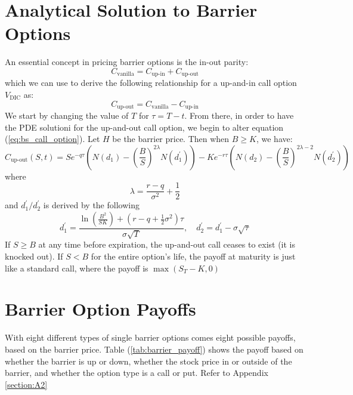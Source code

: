 \section{Analytical Solution to Barrier Options}

An essential concept in pricing barrier options is the in-out parity:
\[
	C_{\text{vanilla}}=C_{\text{up-in}}+C_{\text{up-out}}
\]
which we can use to derive the following relationship for a up-and-in call option$V_{\text{DIC}}$ as:
\[
	C_{\text{up-out}}=C_{\text{vanilla}}-C_{\text{up-in}}
\]
We start by changing the value of $T$ for $\tau=T-t$. From there, in order to have the PDE solutioni for the up-and-out call option, we begin to alter equation (\ref{eq:bs_call_option}). Let $H$ be the barrier price. Then when $B\geq K$, we have:
\begin{equation}\label{eq:DOC}
	C_{\text{up-out}}(S,t)=Se^{-q\tau}\left(N(d_1)-\left(\frac{B}{S}\right)^{2\lambda}N(d^\prime_1)\right)-Ke^{-r\tau}\left(N(d_2)-\left(\frac{B}{S}\right)^{2\lambda-2} N(d^\prime_2)\right)
\end{equation}
where
\begin{equation}
	\lambda=\frac{r-q}{\sigma^2}+\frac{1}{2}
\end{equation}
and $d^\prime_1/d^\prime_2$ is derived by the following
\begin{equation}
	d^\prime_1=\frac{\ln\left(\frac{B^2}{SK}\right)+(r-q+\tfrac{1}{2}\sigma^2)\tau}{\sigma\sqrt{T}},\quad d^\prime_2=d^\prime_1-\sigma\sqrt{\tau}
\end{equation}
If $S\geq B$ at any time before expiration, the up-and-out call ceases to exist (it is knocked out). If $S<B$ for the entire option's life, the payoff at maturity is just like a standard call, where the payoff is $\max\left(S_T-K, 0\right)$

\section{Barrier Option Payoffs}

With eight different types of single barrier options comes eight possible payoffs, based on the barrier price. Table (\ref{tab:barrier_payoff}) shows the payoff based on whether the barrier is up or down, whether the stock price in or outside of the barrier, and whether the option type is a call or put. Refer to Appendix \ref{section:A2}

